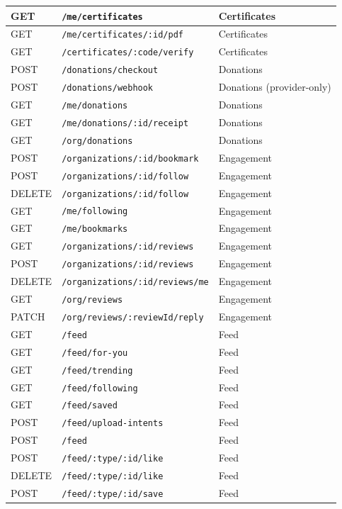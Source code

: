 \begin{longtable}{|p{}|p{}|p{}|}
GET & \texttt{/me/certificates} & Certificates\\\hline
GET & \texttt{/me/certificates/:id/pdf} & Certificates\\\hline
GET & \texttt{/certificates/:code/verify} & Certificates\\\hline
POST & \texttt{/donations/checkout} & Donations\\\hline
POST & \texttt{/donations/webhook} & Donations (provider-only)\\\hline
GET & \texttt{/me/donations} & Donations\\\hline
GET & \texttt{/me/donations/:id/receipt} & Donations\\\hline
GET & \texttt{/org/donations} & Donations\\\hline
POST & \texttt{/organizations/:id/bookmark} & Engagement\\\hline
POST & \texttt{/organizations/:id/follow} & Engagement\\\hline
DELETE & \texttt{/organizations/:id/follow} & Engagement\\\hline
GET & \texttt{/me/following} & Engagement\\\hline
GET & \texttt{/me/bookmarks} & Engagement\\\hline
GET & \texttt{/organizations/:id/reviews} & Engagement\\\hline
POST & \texttt{/organizations/:id/reviews} & Engagement\\\hline
DELETE & \texttt{/organizations/:id/reviews/me} & Engagement\\\hline
GET & \texttt{/org/reviews} & Engagement\\\hline
PATCH & \texttt{/org/reviews/:reviewId/reply} & Engagement\\\hline
GET & \texttt{/feed} & Feed\\\hline
GET & \texttt{/feed/for-you} & Feed\\\hline
GET & \texttt{/feed/trending} & Feed\\\hline
GET & \texttt{/feed/following} & Feed\\\hline
GET & \texttt{/feed/saved} & Feed\\\hline
POST & \texttt{/feed/upload-intents} & Feed\\\hline
POST & \texttt{/feed} & Feed\\\hline
POST & \texttt{/feed/:type/:id/like} & Feed\\\hline
DELETE & \texttt{/feed/:type/:id/like} & Feed\\\hline
POST & \texttt{/feed/:type/:id/save} & Feed\\\hline

\end{longtable}
